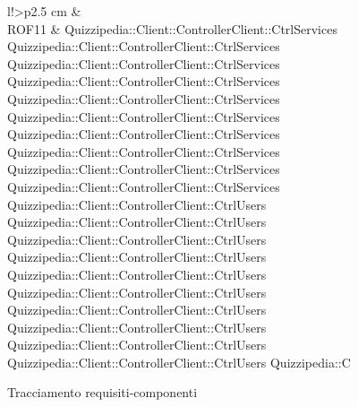 \begin{tabella}{l!{\VRule}>{\centering\arraybackslash}p{2.5 cm}}
\color{white}  & \color{white}  \\
\endhead
ROF11 & Quizzipedia::Client::ControllerClient::CtrlServices \linebreak Quizzipedia::Client::ControllerClient::CtrlServices \linebreak Quizzipedia::Client::ControllerClient::CtrlServices \linebreak Quizzipedia::Client::ControllerClient::CtrlServices \linebreak Quizzipedia::Client::ControllerClient::CtrlServices \linebreak Quizzipedia::Client::ControllerClient::CtrlServices \linebreak Quizzipedia::Client::ControllerClient::CtrlServices \linebreak Quizzipedia::Client::ControllerClient::CtrlServices \linebreak Quizzipedia::Client::ControllerClient::CtrlServices \linebreak Quizzipedia::Client::ControllerClient::CtrlServices \linebreak Quizzipedia::Client::ControllerClient::CtrlUsers \linebreak Quizzipedia::Client::ControllerClient::CtrlUsers \linebreak Quizzipedia::Client::ControllerClient::CtrlUsers \linebreak Quizzipedia::Client::ControllerClient::CtrlUsers \linebreak Quizzipedia::Client::ControllerClient::CtrlUsers \linebreak Quizzipedia::Client::ControllerClient::CtrlUsers \linebreak Quizzipedia::Client::ControllerClient::CtrlUsers \linebreak Quizzipedia::Client::ControllerClient::CtrlUsers \linebreak Quizzipedia::Client::ControllerClient::CtrlUsers \linebreak Quizzipedia::Client::ControllerClient::CtrlUsers \linebreak Quizzipedia::C \\
\caption{Tracciamento requisiti-componenti}
\end{tabella}

